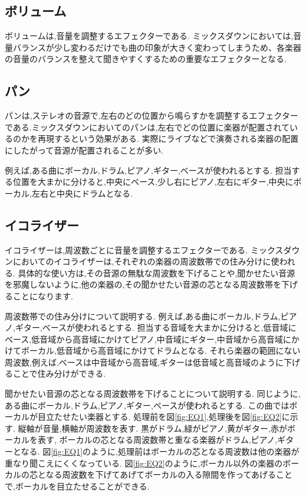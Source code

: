 \documentclass[12pt,a4j,titlepage]{ltjsarticle}
\begin{document}
\subsection{ボリューム}
ボリュームは,音量を調整するエフェクターである.
ミックスダウンにおいては,音量バランスが少し変わるだけでも曲の印象が大きく変わってしまうため、各楽器の音量のバランスを整えて聞きやすくするための重要なエフェクターとなる.
\subsection{パン}
パンは,ステレオの音源で,左右のどの位置から鳴らすかを調整するエフェクターである.ミックスダウンにおいてのパンは,左右でどの位置に楽器が配置されているのかを再現するという効果がある.
実際にライブなどで演奏される楽器の配置にしたがって音源が配置されることが多い.

例えば,ある曲にボーカル,ドラム,ピアノ,ギター,ベースが使われるとする.
担当する位置を大まかに分けると,中央にベース,少し右にピアノ,左右にギター,中央にボーカル,左右と中央にドラムとなる.

\subsection{イコライザー}
イコライザーは,周波数ごとに音量を調整するエフェクターである.
ミックスダウンにおいてのイコライザーは,それぞれの楽器の周波数帯での住み分けに使われる.
具体的な使い方は,その音源の無駄な周波数を下げることや,聞かせたい音源を邪魔しないように,他の楽器の,その聞かせたい音源の芯となる周波数帯を下げることになります.

周波数帯での住み分けについて説明する.
例えば,ある曲にボーカル,ドラム,ピアノ,ギター,ベースが使われるとする.
担当する音域を大まかに分けると,低音域にベース,低音域から高音域にかけてピアノ,中音域にギター,中音域から高音域にかけてボーカル,低音域から高音域にかけてドラムとなる.
それら楽器の範囲にない周波数,例えば,ベースは中音域から高音域,ギターは低音域と高音域のように下げることで住み分けができる.

聞かせたい音源の芯となる周波数帯を下げることについて説明する.
同じように,ある曲にボーカル,ドラム,ピアノ,ギター,ベースが使われるとする.
この曲ではボーカルが目立たせたい楽器とする.
処理前を図\ref{fig:EQ1},処理後を図\ref{fig:EQ2}に示す.
縦軸が音量,横軸が周波数を表す.
黒がドラム,緑がピアノ,黄がギター,赤がボーカルを表す,
ボーカルの芯となる周波数帯と重なる楽器がドラム,ピアノ,ギターとなる.
図\ref{fig:EQ1}のように,処理前はボーカルの芯となる周波数は他の楽器が重なり聞こえにくくなっている.
図\ref{fig:EQ2}のように,ボーカル以外の楽器のボーカルの芯となる周波数を下げてあげてボーカルの入る隙間を作ってあげることで,ボーカルを目立たせることができる.
\end{document}

